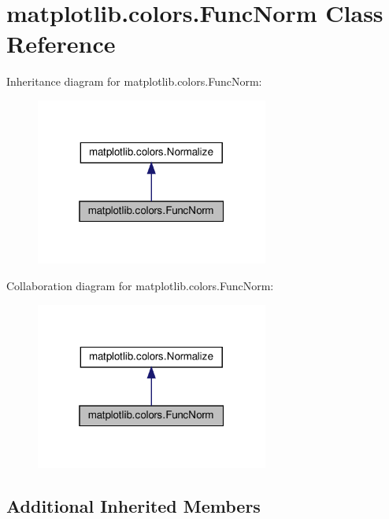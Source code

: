 \hypertarget{classmatplotlib_1_1colors_1_1FuncNorm}{}\section{matplotlib.\+colors.\+Func\+Norm Class Reference}
\label{classmatplotlib_1_1colors_1_1FuncNorm}


Inheritance diagram for matplotlib.\+colors.\+Func\+Norm\+:
\nopagebreak
\begin{figure}[H]
\begin{center}
\leavevmode
\includegraphics[width=217pt]{classmatplotlib_1_1colors_1_1FuncNorm__inherit__graph}
\end{center}
\end{figure}


Collaboration diagram for matplotlib.\+colors.\+Func\+Norm\+:
\nopagebreak
\begin{figure}[H]
\begin{center}
\leavevmode
\includegraphics[width=217pt]{classmatplotlib_1_1colors_1_1FuncNorm__coll__graph}
\end{center}
\end{figure}
\subsection*{Additional Inherited Members}


